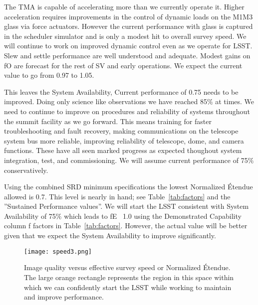 The TMA is capable of accelerating more than we currently operate it. Higher acceleration requires improvements in the control of dynamic loads on the M1M3 glass via force actuators. However the current performance with glass is captured in the scheduler simulator and is only a modest hit to overall survey speed. We will continue to work on improved dynamic control even as we operate for LSST. Slew and settle performance are well understood and adequate. Modest gains on fO are forecast for the rest of SV and early operations. We expect the current value to go from 0.97 to 1.05. 

This leaves the System Availability, Current performance of 0.75 needs to be improved. Doing only science like observations we have reached 85$\%$ at times. We need to continue to improve on procedures and reliability of systems throughout the summit facility as we go forward. This means training for faster troubleshooting and fault recovery, making communications on the telescope system bus more reliable, improving reliability of telescope, dome, and camera functions. These have all seen marked progress as expected thoughout system integration, test, and commissioning. We will assume current performance of 75$\%$ conservatively. 

Using the combined SRD minimum specifications the lowest Normalized \'{E}tendue allowed is 0.7. This level is nearly in hand; see Table~\ref{tab:factors} and the ''Sustained Performance values''. We will start the LSST consistent with System Availability of 75$\%$ which leads to fE \approx~1.0 using the Demonstrated Capability column f factors in Table~\ref{tab:factors}. However, the actual value will be better given that we expect the System Availability to improve significantly. 

\begin{figure}[t]
\centering
\texttt{[image: speed3.png]}
\caption{Image quality versus effective survey speed or Normalized \'{E}tendue. The large orange rectangle represents the region in this space within which we can confidently start the LSST while working to maintain and improve performance.}
\label{speed3}
\end{figure}

\newpage
